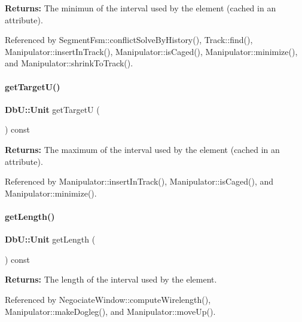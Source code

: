 {\bfseries Returns\+:} The minimun of the interval used by the element (cached in an attribute). 

Referenced by Segment\+Fsm\+::conflict\+Solve\+By\+History(), Track\+::find(), Manipulator\+::insert\+In\+Track(), Manipulator\+::is\+Caged(), Manipulator\+::minimize(), and Manipulator\+::shrink\+To\+Track().

\mbox{\label{classKite_1_1TrackElement_a4d52a506cd19dfa8e22e1dc0695bd960}} 
\paragraph{\texorpdfstring{get\+Target\+U()}{getTargetU()}}
{\footnotesize\ttfamily \textbf{ Db\+U\+::\+Unit} get\+TargetU (\begin{DoxyParamCaption}{ }\end{DoxyParamCaption}) const\hspace{0.3cm}{\ttfamily [inline]}}

{\bfseries Returns\+:} The maximum of the interval used by the element (cached in an attribute). 

Referenced by Manipulator\+::insert\+In\+Track(), Manipulator\+::is\+Caged(), and Manipulator\+::minimize().

\mbox{\label{classKite_1_1TrackElement_ab1ca7adfc68761c749a16f65c9aa4088}} 
\paragraph{\texorpdfstring{get\+Length()}{getLength()}}
{\footnotesize\ttfamily \textbf{ Db\+U\+::\+Unit} get\+Length (\begin{DoxyParamCaption}{ }\end{DoxyParamCaption}) const\hspace{0.3cm}{\ttfamily [inline]}}

{\bfseries Returns\+:} The length of the interval used by the element. 

Referenced by Negociate\+Window\+::compute\+Wirelength(), Manipulator\+::make\+Dogleg(), and Manipulator\+::move\+Up().

